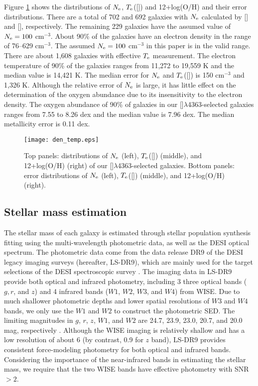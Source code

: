 \documentclass[twocolumn]{aastex631}
\newcommand{\SII}{[\mbox{\ion{S}{2}}]}    %
\newcommand{\OIII}{[\mbox{\ion{O}{3}}]}   %
\newcommand{\OIIIFOT}{[\mbox{\ion{O}{3}}]$\lambda$4363}
\newcommand{\OII}{[\mbox{\ion{O}{2}}]}    %
\newcommand{\Te}{\mbox{$T_{\rm e}$}}
\newcommand{\Ne}{\mbox{$N_{\rm e}$}}
\newcommand{\boldtext}[1]{\textcolor[rgb]{0,0,0}{#1}}
\begin{document}
Figure \ref{fig:dentemp} shows the distributions of {\Ne}, \Te(\OIII) and 12+log(O/H) \boldtext{and their error distributions}. There are a total of 702 and 692 galaxies with {\Ne} calculated by {\SII} and {\OII}, respectively. The remaining 229 galaxies have the assumed value of $\Ne=100$ cm$^{-3}$. About 90\% of the galaxies have an electron density in the range of 76--629 cm$^{-3}$. The assumed $\Ne=100$ cm$^{-3}$ in this paper is in the valid range. There are about 1,608 galaxies with effective {\Te} measurement. The electron temperature of 90\% of the galaxies ranges from 11,272 to 19,559 K and the median value is 14,421 K. The median error for {\Ne} and  \Te(\OIII) is 150 cm$^{-3}$ and 1,326 K. Although the relative error of {\Ne} is large, it has little effect on the determination of the oxygen abundance due to its insensitivity to the electron density. The oxygen abundance of 90\% of galaxies in our \OIIIFOT-selected galaxies ranges from 7.55 to 8.26 dex and the median value is 7.96 dex. The median metallicity error is 0.11 dex.

\begin{figure*}[tbh!]
\texttt{[image: den\_temp.eps]}
\caption{\boldtext{Top panels: distributions of {\Ne} (left), \Te(\OIII) (middle), and 12+log(O/H) (right) of our \OIIIFOT-selected galaxies. Bottom panels: error distributions of {\Ne} (left), \Te(\OIII) (middle), and 12+log(O/H) (right).} \label{fig:dentemp}}
\end{figure*}

\subsection{Stellar mass estimation}
The stellar mass of each galaxy is estimated through stellar population synthesis fitting using the multi-wavelength photometric data, as well as the DESI optical spectrum. The photometric data come from the data release DR9 of the DESI legacy imaging surveys (hereafter, LS-DR9), which are mainly used for the target selections of the DESI spectroscopic survey \citep{Zou17, Dey19}. The imaging data in LS-DR9 provide both optical and infrared photometry, including 3 three optical bands ($g,r$, and $z$) and 4 infrared bands ($W1$, $W2$, $W3$, and $W4$) from WISE. Due to much shallower photometric depths and lower spatial resolutions of $W3$ and $W4$ bands, we only use the $W1$ and $W2$ to construct the photometric SED. The limiting magnitudes in $g$, $r$, $z$, $W1$, and $W2$ are 24.7, 23.9, 23.0, 20.7, and 20.0 mag, respectively \citep{Zou22}. Although the WISE imaging is relatively shallow and has a low resolution of about 6{\arcsec} (by contrast, 0.9{\arcsec} for $z$ band),  LS-DR9 provides consistent force-modeling photometry for both optical and infrared bands. Considering the importance of the near-infrared bands in estimating the stellar mass, we require that the two WISE bands have effective photometry with SNR $>2$.  
\end{document}
